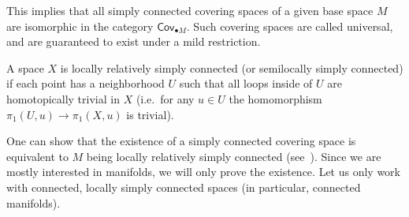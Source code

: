 This implies that all simply connected covering spaces of a given base space $M$ are isomorphic in the category $\mathsf{Cov}_{\bullet M}$. Such covering spaces are called universal, and are guaranteed to exist under a mild restriction.

\begin{defn}
    A space $X$ is locally relatively simply connected (or semilocally simply connected) if each point has a neighborhood $U$ such that all loops inside of $U$ are homotopically trivial in $X$ (i.e.\ for any $u\in U$ the homomorphism $\pi_1(U,u)\to \pi_1(X,u)$ is trivial).
\end{defn}


One can show that the existence of a simply connected covering space is equivalent to $M$ being locally relatively simply connected (see~\cite[Theorem~8.4]{Bredon}). Since we are mostly interested in manifolds, we will only prove the existence. Let us only work with connected, locally simply connected spaces (in particular, connected manifolds).

